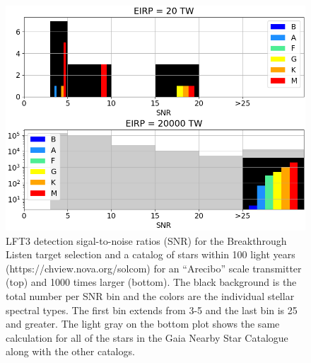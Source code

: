 \begin{figure}
    \centering
    \includegraphics[width=0.75\linewidth]{figures/catcounts.png}
    \caption{LFT3 detection sigal-to-noise ratios (SNR) for the Breakthrough Listen target selection \citep{2017PASP..129e4501I} and a catalog of stars within 100 light years (https://chview.nova.org/solcom) for an ``Arecibo'' scale transmitter (top) and 1000 times larger (bottom).  The black background is the total number per SNR bin and the colors are the individual stellar spectral types.  The first bin extends from 3-5 and the last bin is 25 and greater.  The light gray on the bottom plot shows the same calculation for all of the stars in the Gaia Nearby Star Catalogue \citep{2021A&A...649A...6G} along with the other catalogs.}
    \label{fig:isaacsonetal}
\end{figure}


